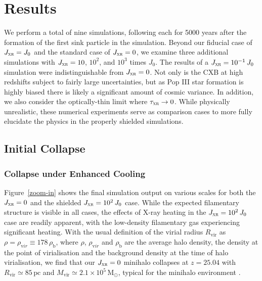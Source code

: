 \documentclass{thesis}
\newcommand{\msun}{\ensuremath{\,\mathrm{M}_{\odot}}\xspace}
\newcommand{\pc}{\ensuremath{\,\mathrm{pc}}\xspace}
\newcommand{\rvir}{\ensuremath{{R}_{\mathrm{vir}}}\xspace}
\newcommand{\mvir}{\ensuremath{{M}_{\mathrm{vir}}}\xspace}
\newcommand{\jxr}{\ensuremath{J_{\textsc{xr}}}\xspace}
\newcommand{\RefFig}[1]{\mbox{Figure~\ref{#1}}}
\begin{document}
\section{Results}
\label{results}
We perform a total of nine simulations, following each for 5000 years after the formation of the first sink particle in the simulation.  Beyond our fiducial case of $\jxr=J_0$ and the standard case of $\jxr=0$, we examine three additional  simulations with $\jxr = 10$, $10^2$, and $10^3$ times $J_0$. The results of a $\jxr = 10^{-1}\,J_0$ simulation were indistinguishable from $\jxr=0$. Not only is the CXB at high redshifts subject to fairly large uncertainties, but as Pop III star formation is highly biased there is likely a significant amount of cosmic variance.
In addition, we also consider the optically-thin limit where $\tau_{\textsc{xr}} \rightarrow 0$.  While physically unrealistic, these numerical experiments serve as comparison cases to more fully elucidate the physics in the properly shielded simulations.

\subsection{Initial Collapse}
\label{collapse}
\subsubsection{Collapse under Enhanced Cooling}
\label{collapse_acceleration}
\RefFig{zoom-in} shows the final simulation output on various scales for both the $\jxr=0$ and the shielded $\jxr = 10^2\,J_0$ case.  While the expected filamentary structure is visible in all cases, the effects of X-ray heating in the  $\jxr = 10^2\,J_0$ case are readily apparent, with the low-density filamentary gas  
experiencing significant heating. With the usual definition of the virial radius \rvir as $\rho = \rho_{\mathrm vir} \equiv 178\,\rho_{\mathrm b}$, where $\rho$, $\rho_{\mathrm vir}$ and $\rho_{\mathrm b}$ are the average halo density, the density at the point of virialisation and the background density at the time of halo virialisation, we find that our $\jxr = 0$ minihalo collapses at $z=25.04$ with $\rvir \simeq 85\pc$ and $\mvir \simeq 2.1\times10^5\msun$, typical for the minihalo environment \citep{Bromm2013}.  
\end{document}
